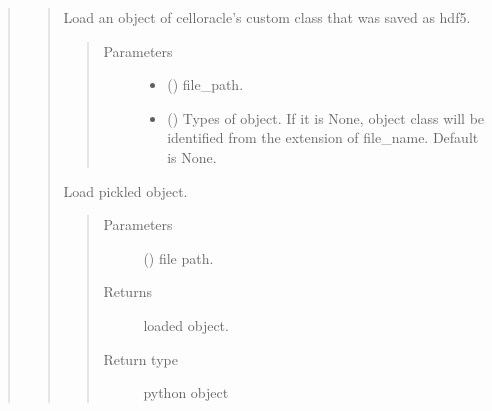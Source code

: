 \documentclass[letterpaper,10pt,english]{sphinxmanual}
\begin{document}
\begin{quote}
\begin{quote}
\begin{fulllineitems}
\label{\detokenize{modules/celloracle.utility:celloracle.utility.load_hdf5}}
Load an object of celloracle’s custom class that was saved as hdf5.
\begin{quote}\begin{description}
\item[{Parameters}] \leavevmode\begin{itemize}
\item {} 
 () \textendash{} file\_path.

\item {} 
 () \textendash{} Types of object.
If it is None, object class will be identified from the extension of file\_name.
Default is None.

\end{itemize}

\end{description}\end{quote}

\end{fulllineitems}


\begin{fulllineitems}
\label{\detokenize{modules/celloracle.utility:celloracle.utility.load_pickled_object}}
Load pickled object.
\begin{quote}\begin{description}
\item[{Parameters}] \leavevmode
{} () \textendash{} file path.

\item[{Returns}] \leavevmode
loaded object.

\item[{Return type}] \leavevmode
python object


\end{description}
\end{quote}
\end{fulllineitems}
\end{quote}
\end{quote}
\end{document}
